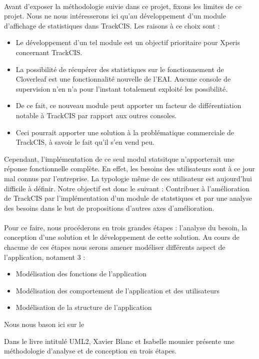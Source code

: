 			\paragraph{}%
			Avant d'exposer la méthodologie suivie dans ce projet, fixons les limites de
			ce projet. Nous ne nous intéresserons ici qu'au développement d'un
			module d'affichage de statistiques dans TrackCIS. Les raisons à ce choix sont
			:
			\begin{itemize}
			  \item Le développement d'un tel module est un objectif prioritaire pour
			  Xperis concernant TrackCIS.
			  \item La possibilité de récupérer des statistiques sur le fonctionnement de
			  Cloverleaf est une fonctionnalité nouvelle de l'EAI. Aucune console de
			  supervision n'en n'a pour l'instant totalement exploité les possibilité.
			  \item De ce fait, ce nouveau module peut apporter un facteur de
			  différentiation notable à TrackCIS par rapport aux outres consoles.
			  \item Ceci pourrait apporter une solution à la problématique commerciale
			  de TrackCIS, à savoir le fait qu'il s'en vend peu.
			\end{itemize}
			Cependant, l'implémentation de ce seul modul statsitque n'apporterait une
			réponse fonctionnelle complète. En effet, les besoins des utilisateurs sont à
			ce jour mal connus par l'entreprise. La typologie même de ces utilisateur est
			aujourd'hui difficile à définir.\newline
			Notre objectif est donc le suivant :\newline
			Contribuer à l'amélioration de TrackCIS par l'implémentation d'un module de
			statstiques et par une analyse des besoins dans le but de propositions
			d'autres axes d'amélioration.

			\paragraph{}%
			Pour ce faire, nous procéderons en trois grandes étapes : l'analyse du
			besoin, la conception d'une solution et le développement de cette
			solution. Au cours de chacune de ces étapes nous serons amener  modéliser
			différents aspect de l'application, notament 3 :
			\begin{itemize}
			  \item Modélisation des fonctions de l'application
			  \item Modélisation des comportement de l'application et des utilisateurs
			  \item Modélisation de la structure de l'application
			\end{itemize}
			Nous nous bason ici sur le
			
			Dans le livre intitulé UML2, Xavier Blanc et Isabelle mounier présente une
			méthodologie d'analyse et de conception en trois étapes.
			
			\paragraph{}%
			
			
			
			
